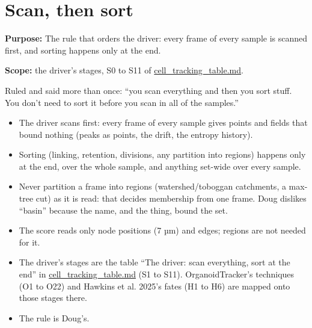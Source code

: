 \chapter{\texorpdfstring{Scan, then sort}{Scan, then sort}}
\label{chap:scan-then-sort}

\textbf{Purpose:} The rule that orders the driver: every frame of every sample is scanned first, and sorting happens only at the end.

\textbf{Scope:} the driver's stages, S0 to S11 of \hyperref[chap:cell-tracking-table]{cell\_\allowbreak{}tracking\_\allowbreak{}table.md}.

Ruled and said more than once: “you scan everything and then you sort stuff. You don't need to sort it before you scan in all of the samples.”

\begin{itemize}
\item The driver scans first: every frame of every sample gives points and fields that bound nothing (peaks as points, the drift, the entropy history).
\item Sorting (linking, retention, divisions, any partition into regions) happens only at the end, over the whole sample, and anything set-wide over every sample.
\item Never partition a frame into regions (watershed/toboggan catchments, a max-tree cut) as it is read: that decides membership from one frame. Doug dislikes “basin” because the name, and the thing, bound the set.
\item The score reads only node positions (7 µm) and edges; regions are not needed for it.
\item The driver's stages are the table “The driver: scan everything, sort at the end” in \hyperref[chap:cell-tracking-table]{cell\_\allowbreak{}tracking\_\allowbreak{}table.md} (S1 to S11). OrganoidTracker's techniques (O1 to O22) and Hawkins et al. 2025's fates (H1 to H6) are mapped onto those stages there.
\item The rule is Doug's.
\end{itemize}

